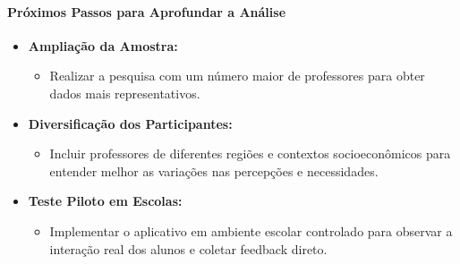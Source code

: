 \paragraph{Próximos Passos para Aprofundar a Análise}

\begin{itemize}
    \item \textbf{Ampliação da Amostra:}
    \begin{itemize}
        \item Realizar a pesquisa com um número maior de professores para obter dados mais representativos.
    \end{itemize}
    \item \textbf{Diversificação dos Participantes:}
    \begin{itemize}
        \item Incluir professores de diferentes regiões e contextos socioeconômicos para entender melhor as variações nas percepções e necessidades.
    \end{itemize}
    \item \textbf{Teste Piloto em Escolas:}
    \begin{itemize}
        \item Implementar o aplicativo em ambiente escolar controlado para observar a interação real dos alunos e coletar feedback direto.
    \end{itemize}
\end{itemize}








